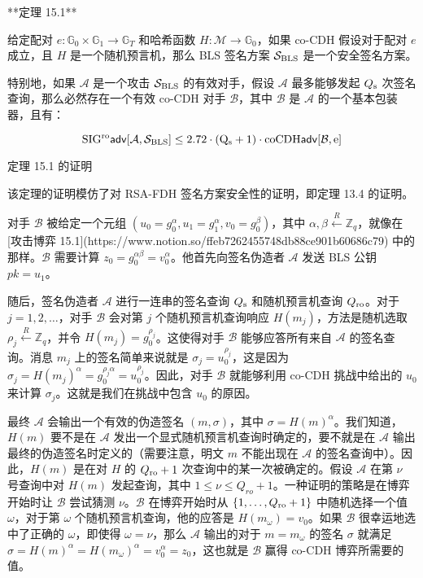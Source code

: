 **定理 15.1**

给定配对 $e: \mathbb{G}_0 \times \mathbb{G}_1 \rightarrow \mathbb{G}_T$ 和哈希函数 $H: \mathcal{M} \rightarrow \mathbb{G}_0$，如果 co-CDH 假设对于配对 $e$ 成立，且 $H$ 是一个随机预言机，那么 BLS 签名方案 $\mathcal{S}_{\rm BLS}$ 是一个安全签名方案。

特别地，如果 $\mathcal{A}$ 是一个攻击 $\mathcal{S}_{\rm BLS}$ 的有效对手，假设 $\mathcal{A}$ 最多能够发起 $Q_{\rm s}$ 次签名查询，那么必然存在一个有效 co-CDH 对手 $\mathcal{B}$，其中 $\mathcal{B}$ 是 $\mathcal{A}$ 的一个基本包装器，且有：

$$
\rm{SIG^{ro}\mathsf{adv}}[\mathcal{A},\mathcal{S}_{BLS}]\leq 2.72 \cdot (Q_s+1)\cdot\rm{coCDH\mathsf{adv}}[\mathcal{B},e]
$$

定理 15.1 的证明

该定理的证明模仿了对 RSA-FDH 签名方案安全性的证明，即定理 13.4 的证明。

对手 $\mathcal{B}$ 被给定一个元组 $(u_0=g_0^\alpha, u_1=g_1^\alpha, v_0=g_0^\beta)$，其中 $\alpha,\beta\overset{R}\leftarrow\mathbb{Z}_q$，就像在[攻击博弈 15.1](https://www.notion.so/ffeb7262455748db88ce901b60686c79) 中的那样。$\mathcal{B}$ 需要计算 $z_0=g_0^{\alpha\beta}=v_0^\alpha$。他首先向签名伪造者 $\mathcal{A}$ 发送 BLS 公钥 $pk=u_1$。

随后，签名伪造者 $\mathcal{A}$ 进行一连串的签名查询 $Q_{\rm s}$ 和随机预言机查询 $Q_{\rm ro}$。对于 $j=1,2,\dots$，对手 $\mathcal{B}$ 会对第 $j$ 个随机预言机查询响应 $H(m_j)$，方法是随机选取 $\rho_j\overset{R}\leftarrow\mathbb{Z}_q$，并令 $H(m_j)=g_0^{\rho_j}$。这使得对手 $\mathcal{B}$ 能够应答所有来自 $\mathcal{A}$ 的签名查询。消息 $m_j$ 上的签名简单来说就是 $\sigma_j=u_0^{\rho_j}$，这是因为 $\sigma_j=H(m_j)^\alpha=g_0^{\rho_j\alpha}=u_0^{\rho_j}$。因此，对手 $\mathcal{B}$ 就能够利用 co-CDH 挑战中给出的 $u_0$ 来计算 $\sigma_j$。这就是我们在挑战中包含 $u_0$ 的原因。

最终 $\mathcal{A}$ 会输出一个有效的伪造签名 $(m,\sigma)$，其中 $\sigma=H(m)^\alpha$。我们知道，$H(m)$ 要不是在 $\mathcal{A}$ 发出一个显式随机预言机查询时确定的，要不就是在 $\mathcal{A}$ 输出最终的伪造签名时定义的（需要注意，明文 $m$ 不能出现在 $\mathcal{A}$ 的签名查询中）。因此，$H(m)$ 是在对 $H$ 的 $Q_{\rm ro}+1$ 次查询中的某一次被确定的。假设 $\mathcal{A}$ 在第 $\nu$ 号查询中对 $H(m)$ 发起查询，其中 $1\leq\nu\leq Q_{ro}+1$。一种证明的策略是在博弈开始时让 $\mathcal{B}$ 尝试猜测 $\nu$。$\mathcal{B}$ 在博弈开始时从 $\{1,\dots,Q_{\rm ro}+1\}$ 中随机选择一个值 $\omega$，对于第 $\omega$ 个随机预言机查询，他的应答是 $H(m_\omega)=v_0$。如果 $\mathcal{B}$ 很幸运地选中了正确的 $\omega$，即使得 $\omega=\nu$，那么 $\mathcal{A}$ 输出的对于 $m=m_\omega$ 的签名 $\sigma$ 就满足 $\sigma=H(m)^\alpha=H(m_\omega)^\alpha=v_0^\alpha=z_0$，这也就是 $\mathcal{B}$ 赢得 co-CDH 博弈所需要的值。

